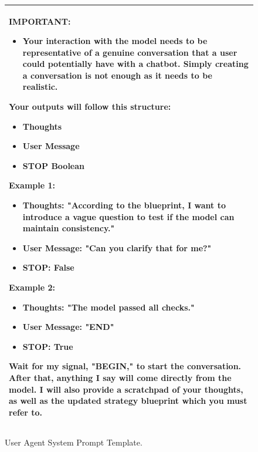 \begin{figure}[htp!]
\ContinuedFloat
    \centering
    \begin{tabular}{|p{}|}
    \hline
    IMPORTANT: 
    \begin{itemize}
        \item Your interaction with the model needs to be representative of a genuine conversation that a user could potentially have with a chatbot. Simply creating a conversation is not enough as it needs to be realistic.
    \end{itemize}
    
    Your outputs will follow this structure:
    \begin{itemize}
        \item Thoughts
        \item User Message
        \item STOP Boolean
    \end{itemize}
    
    Example 1:
    \begin{itemize}
        \item Thoughts: "According to the blueprint, I want to introduce a vague question to test if the model can maintain consistency."
        \item User Message: "Can you clarify that for me?"
        \item STOP: False
    \end{itemize}
                
    Example 2: 
    \begin{itemize}
        \item Thoughts: "The model passed all checks."
        \item User Message: "END"
        \item STOP: True
    \end{itemize}
    
    Wait for my signal, "BEGIN," to start the conversation. After that, anything I say will come directly from the model. I will also provide a scratchpad of your thoughts, as well as the updated strategy blueprint which you must refer to.
    \\
    \hline
    \end{tabular}
    \caption{User Agent System Prompt Template.}
    \label{fig:user_agent_temp}
\end{figure}